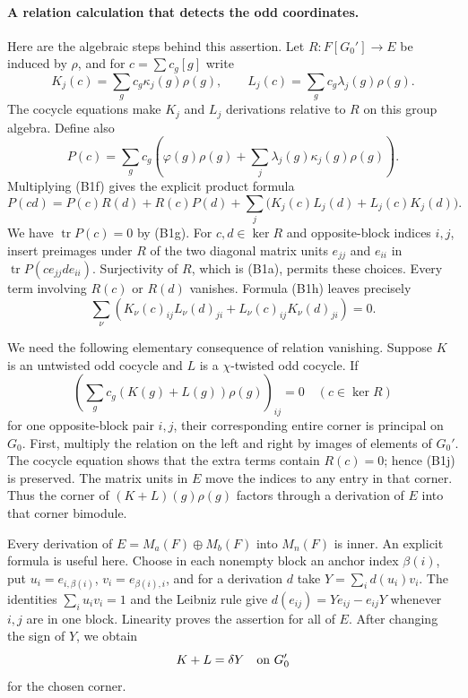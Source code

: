 \paragraph{A relation calculation that detects the odd coordinates.}
Here are the algebraic steps behind this assertion.
Let \(R:F[G_0']\to E\) be induced by \(\rho\), and for
\(c=\sum c_g[g]\) write
\[
 K_j(c)=\sum_gc_g\kappa_j(g)\rho(g),\qquad
 L_j(c)=\sum_gc_g\lambda_j(g)\rho(g).
\]
The cocycle equations make \(K_j\) and \(L_j\) derivations
relative to \(R\) on this group algebra.
Define also
\[
 P(c)=\sum_gc_g\left(\varphi(g)\rho(g)+
                     \sum_j\lambda_j(g)\kappa_j(g)\rho(g)\right).
\]
Multiplying (B1f) gives the explicit product formula
\[
 P(cd)=P(c)R(d)+R(c)P(d)+
                  \sum_j\bigl(K_j(c)L_j(d)+L_j(c)K_j(d)\bigr).
 \tag{B1h}
\]
We have \(\operatorname{tr}P(c)=0\) by (B1g).
For \(c,d\in\ker R\) and opposite-block indices \(i,j\), insert
preimages under \(R\) of the two diagonal matrix units
\(e_{jj}\) and \(e_{ii}\) in \(\operatorname{tr}P(c e_{jj}d e_{ii})\).
Surjectivity of \(R\), which is (B1a), permits these choices.
Every term involving \(R(c)\) or \(R(d)\) vanishes.
Formula (B1h) leaves precisely
\[
 \sum_\nu\left(
      K_\nu(c)_{ij}L_\nu(d)_{ji}
                 +L_\nu(c)_{ij}K_\nu(d)_{ji}\right)=0 .
 \tag{B1i}
\]

We need the following elementary consequence of relation vanishing.
Suppose \(K\) is an untwisted odd cocycle and \(L\) is a
\(\chi\)-twisted odd cocycle.  If
\[
       \left(\sum_gc_g(K(g)+L(g))\rho(g)\right)_{ij}=0
                                  \quad(c\in\ker R)
 \tag{B1j}
\]
for one opposite-block pair \(i,j\), their corresponding entire
corner is principal on \(G_0\).
First, multiply the relation on the left and right by images
of elements of \(G_0'\).
The cocycle equation shows that the extra terms contain
\(R(c)=0\); hence (B1j) is preserved.
The matrix units in \(E\) move the indices to any entry in that
corner.
Thus the corner of \((K+L)(g)\rho(g)\) factors through a derivation
of \(E\) into that corner bimodule.

Every derivation of \(E=M_a(F)\oplus M_b(F)\) into \(M_n(F)\)
is inner.  An explicit formula is useful here.
Choose in each nonempty block an anchor index \(\beta(i)\),
put \(u_i=e_{i,\beta(i)}\), \(v_i=e_{\beta(i),i}\), and for a
derivation \(d\) take \(Y=\sum_i d(u_i)v_i\).
The identities
\(\sum_i u_iv_i=1\) and the Leibniz rule give
\(d(e_{ij})=Ye_{ij}-e_{ij}Y\) whenever \(i,j\) are in one block.
Linearity proves the assertion for all of \(E\).
After changing the sign of \(Y\), we obtain
\[
                  K+L=\delta Y\quad\hbox{on }G_0'
\]
for the chosen corner.

